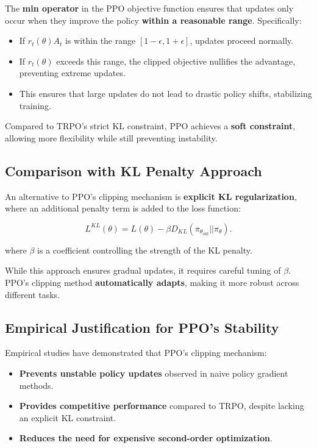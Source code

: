 \documentclass[12pt]{extreport} %
\begin{document}
The \textbf{min operator} in the PPO objective function ensures that updates only occur when they improve the policy \textbf{within a reasonable range}. Specifically:

\begin{itemize}
    \item If \( r_t(\theta) A_t \) is within the range \([1-\epsilon, 1+\epsilon]\), updates proceed normally.
    \item If \( r_t(\theta) \) exceeds this range, the clipped objective nullifies the advantage, preventing extreme updates.
    \item This ensures that large updates do not lead to drastic policy shifts, stabilizing training.
\end{itemize}

Compared to TRPO's strict KL constraint, PPO achieves a \textbf{soft constraint}, allowing more flexibility while still preventing instability.

\subsection{\textbf{Comparison with KL Penalty Approach}}

An alternative to PPO's clipping mechanism is \textbf{explicit KL regularization}, where an additional penalty term is added to the loss function:

\begin{equation}
L^{KL}(\theta) = L(\theta) - \beta D_{KL}(\pi_{\theta_{\text{old}}} || \pi_{\theta}).
\end{equation}

where \( \beta \) is a coefficient controlling the strength of the KL penalty.

While this approach ensures gradual updates, it requires careful tuning of \( \beta \). PPO's clipping method \textbf{automatically adapts}, making it more robust across different tasks.

\subsection{\textbf{Empirical Justification for PPO's Stability}}

Empirical studies have demonstrated that PPO's clipping mechanism:
\begin{itemize}
    \item \textbf{Prevents unstable policy updates} observed in naive policy gradient methods.
    \item \textbf{Provides competitive performance} compared to TRPO, despite lacking an explicit KL constraint.
    \item \textbf{Reduces the need for expensive second-order optimization}.
\end{itemize}
\end{document}
